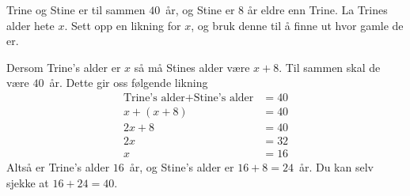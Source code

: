 \documentclass[a4paper,11pt]{article}
\begin{document}

\begin{problem}[1]
  \label{problem:1.9-1-oving-02-2019-MAT-0001}
  Trine og Stine er til sammen $40$~år, og Stine er $8$ år eldre enn Trine. La
  Trines alder hete $x$. Sett opp en likning for $x$, og bruk denne til å finne
  ut hvor gamle de er.  
\end{problem}

\begin{solution}
  Dersom Trine's alder er $x$ så må Stines alder være $x + 8$. Til sammen skal
  de være $40$~år. Dette gir oss følgende likning
  \begin{align*}
    \text{Trine's alder} + \text{Stine's alder} &= 40 \\
    x + (x + 8) &= 40 \\
    2x + 8 &= 40 \\
    2x &= 32 \\
    x &= 16
  \end{align*}
  Altså er Trine's alder $16$~år, og Stine's alder er $16+8=24$~år. Du kan selv
  sjekke at $16 + 24 = 40$.
\end{solution}

\end{document}
